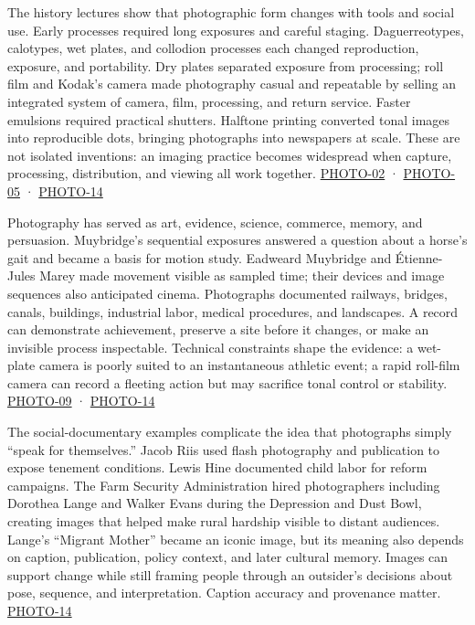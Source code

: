The history lectures show that photographic form changes with tools and social use. Early processes required long exposures and careful staging. Daguerreotypes, calotypes, wet plates, and collodion processes each changed reproduction, exposure, and portability. Dry plates separated exposure from processing; roll film and Kodak's camera made photography casual and repeatable by selling an integrated system of camera, film, processing, and return service. Faster emulsions required practical shutters. Halftone printing converted tonal images into reproducible dots, bringing photographs into newspapers at scale. These are not isolated inventions: an imaging practice becomes widespread when capture, processing, distribution, and viewing all work together. \hyperref[04-visual-computing-ii-ch036-photo-02---photography-session-02]{PHOTO-02} · \hyperref[04-visual-computing-ii-ch036-photo-05---photography-session-05]{PHOTO-05} · \hyperref[04-visual-computing-ii-ch036-photo-14---photography-session-14]{PHOTO-14}

Photography has served as art, evidence, science, commerce, memory, and persuasion. Muybridge's sequential exposures answered a question about a horse's gait and became a basis for motion study. Eadweard Muybridge and Étienne-Jules Marey made movement visible as sampled time; their devices and image sequences also anticipated cinema. Photographs documented railways, bridges, canals, buildings, industrial labor, medical procedures, and landscapes. A record can demonstrate achievement, preserve a site before it changes, or make an invisible process inspectable. Technical constraints shape the evidence: a wet-plate camera is poorly suited to an instantaneous athletic event; a rapid roll-film camera can record a fleeting action but may sacrifice tonal control or stability. \hyperref[04-visual-computing-ii-ch036-photo-09---photography-session-09]{PHOTO-09} · \hyperref[04-visual-computing-ii-ch036-photo-14---photography-session-14]{PHOTO-14}

The social-documentary examples complicate the idea that photographs simply ``speak for themselves.'' Jacob Riis used flash photography and publication to expose tenement conditions. Lewis Hine documented child labor for reform campaigns. The Farm Security Administration hired photographers including Dorothea Lange and Walker Evans during the Depression and Dust Bowl, creating images that helped make rural hardship visible to distant audiences. Lange's ``Migrant Mother'' became an iconic image, but its meaning also depends on caption, publication, policy context, and later cultural memory. Images can support change while still framing people through an outsider's decisions about pose, sequence, and interpretation. Caption accuracy and provenance matter. \hyperref[04-visual-computing-ii-ch036-photo-14---photography-session-14]{PHOTO-14}

